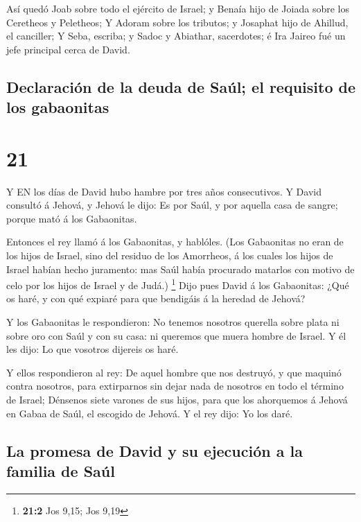  Así quedó Joab sobre todo el ejército de Israel; y Benaía
hijo de Joiada sobre los Ceretheos y Peletheos;  Y Adoram
sobre los tributos; y Josaphat hijo de Ahillud, el canciller;
 Y Seba, escriba; y Sadoc y Abiathar, sacerdotes; é Ira
Jaireo fué un jefe principal cerca de David. 

\hypertarget{declaraciuxf3n-de-la-deuda-de-sauxfal-el-requisito-de-los-gabaonitas}{%
\subsection{Declaración de la deuda de Saúl; el requisito de los
gabaonitas}\label{declaraciuxf3n-de-la-deuda-de-sauxfal-el-requisito-de-los-gabaonitas}}

\hypertarget{section-20}{%
\section{21}\label{section-20}}

 Y EN los días de David hubo hambre por tres años
consecutivos. Y David consultó á Jehová, y Jehová le dijo: Es por Saúl,
y por aquella casa de sangre; porque mató á los Gabaonitas.

 Entonces el rey llamó á los Gabaonitas, y hablóles. (Los
Gabaonitas no eran de los hijos de Israel, sino del residuo de los
Amorrheos, á los cuales los hijos de Israel habían hecho juramento: mas
Saúl había procurado matarlos con motivo de celo por los hijos de Israel
y de Judá.) \footnote{\textbf{21:2} Jos 9,15; Jos 9,19} 
Dijo pues David á los Gabaonitas: ¿Qué os haré, y con qué expiaré para
que bendigáis á la heredad de Jehová?

 Y los Gabaonitas le respondieron: No tenemos nosotros
querella sobre plata ni sobre oro con Saúl y con su casa: ni queremos
que muera hombre de Israel. Y él les dijo: Lo que vosotros dijereis os
haré.

 Y ellos respondieron al rey: De aquel hombre que nos
destruyó, y que maquinó contra nosotros, para extirparnos sin dejar nada
de nosotros en todo el término de Israel;  Dénsenos siete
varones de sus hijos, para que los ahorquemos á Jehová en Gabaa de Saúl,
el escogido de Jehová. Y el rey dijo: Yo los daré.

\hypertarget{la-promesa-de-david-y-su-ejecuciuxf3n-a-la-familia-de-sauxfal}{%
\subsection{La promesa de David y su ejecución a la familia de
Saúl}\label{la-promesa-de-david-y-su-ejecuciuxf3n-a-la-familia-de-sauxfal}}

